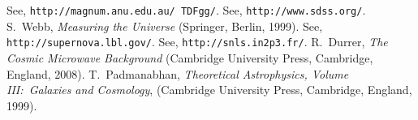 \documentclass[12pt,a4paper,oneside]{book}
\begin{document}
\begin{thebibliography}{99}
See, {\tt http://magnum.anu.edu.au/~TDFgg/}.
See, {\tt http://www.sdss.org/}.
S.~Webb, {\sl Measuring the Universe}\/ (Springer, Berlin, 1999).
See, {\tt http://supernova.lbl.gov/}.
See, {\tt http://snls.in2p3.fr/}.
R.~Durrer, {\sl The Cosmic Microwave Background}\/ (Cambridge University Press, 
Cambridge, England, 2008).
T.~Padmanabhan, {\sl Theoretical Astrophysics, Volume III:~Galaxies and 
Cosmology},\/ (Cambridge University Press, Cambridge, England, 1999).
\end{thebibliography}
\end{document}
